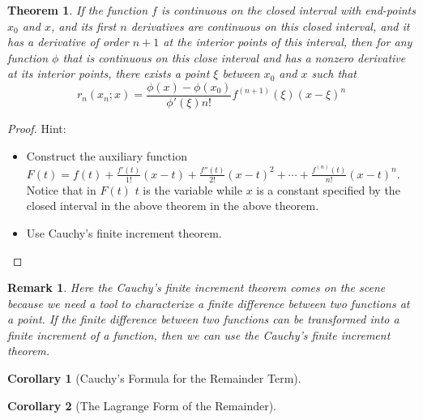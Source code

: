 \documentclass[onecolumn]{ctexart}
\newtheorem{theorem}{Theorem}
\newtheorem{corollary}{Corollary}
\newtheorem{remark}{Remark}
\begin{document}
\begin{theorem}
  If the function $f$ is continuous on the closed interval with end-points $x_0$ 
  and $x$, and its first $n$ derivatives are continuous on this closed interval, 
  and it has a derivative of order $n+1$ at the interior points of this interval, 
  then for any function $\phi$ that is continuous on this close interval and has 
  a nonzero derivative at its interior points, there exists a point $\xi$ between 
  $x_0$ and $x$ such that
  \begin{equation}
    r_n(x_n; x) = \frac{\phi(x) - \phi(x_0)}{\phi'(\xi)n!}f^{(n+1)}(\xi)(x - \xi)^n
  \end{equation}
\end{theorem}
\begin{proof}
  Hint:
  \begin{itemize}
    \item Construct the auxiliary function $F(t) = f(t) + \frac{f'(t)}{1!}(x - t) + 
    \frac{f''(t)}{2!}(x - t)^2 + \cdots + \frac{f^{(n)}(t)}{n!}(x - t)^n$. 
    Notice that in $F(t)$ $t$ is the variable while $x$ is a constant specified 
    by the closed interval in the above theorem in the above theorem.
    \item Use Cauchy's finite increment theorem.
  \end{itemize}
\end{proof}
\begin{remark}
  Here the Cauchy's finite increment theorem comes on the scene because we need 
  a tool to characterize a finite difference between two functions at a point. 
  If the finite difference between two functions can be transformed into a 
  finite increment of a function, then we can use the Cauchy's finite increment 
  theorem.
\end{remark}

\begin{corollary}[Cauchy's Formula for the Remainder Term]
  
\end{corollary}

\begin{corollary}[The Lagrange Form of the Remainder]
  
\end{corollary}
\end{document}
